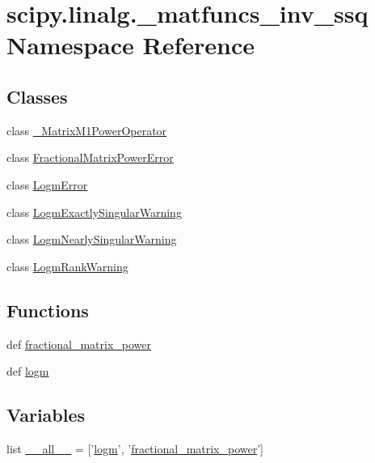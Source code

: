 \hypertarget{namespacescipy_1_1linalg_1_1__matfuncs__inv__ssq}{}\section{scipy.\+linalg.\+\_\+matfuncs\+\_\+inv\+\_\+ssq Namespace Reference}
\label{namespacescipy_1_1linalg_1_1__matfuncs__inv__ssq}
\subsection*{Classes}
\begin{DoxyCompactItemize}
\item 
class \hyperlink{classscipy_1_1linalg_1_1__matfuncs__inv__ssq_1_1__MatrixM1PowerOperator}{\+\_\+\+Matrix\+M1\+Power\+Operator}
\item 
class \hyperlink{classscipy_1_1linalg_1_1__matfuncs__inv__ssq_1_1FractionalMatrixPowerError}{Fractional\+Matrix\+Power\+Error}
\item 
class \hyperlink{classscipy_1_1linalg_1_1__matfuncs__inv__ssq_1_1LogmError}{Logm\+Error}
\item 
class \hyperlink{classscipy_1_1linalg_1_1__matfuncs__inv__ssq_1_1LogmExactlySingularWarning}{Logm\+Exactly\+Singular\+Warning}
\item 
class \hyperlink{classscipy_1_1linalg_1_1__matfuncs__inv__ssq_1_1LogmNearlySingularWarning}{Logm\+Nearly\+Singular\+Warning}
\item 
class \hyperlink{classscipy_1_1linalg_1_1__matfuncs__inv__ssq_1_1LogmRankWarning}{Logm\+Rank\+Warning}
\end{DoxyCompactItemize}
\subsection*{Functions}
\begin{DoxyCompactItemize}
\item 
def \hyperlink{namespacescipy_1_1linalg_1_1__matfuncs__inv__ssq_a671dec8058b079cfc6021ba7664ca754}{fractional\+\_\+matrix\+\_\+power}
\item 
def \hyperlink{namespacescipy_1_1linalg_1_1__matfuncs__inv__ssq_ab002cb04a0e0f317586ade471170e816}{logm}
\end{DoxyCompactItemize}
\subsection*{Variables}
\begin{DoxyCompactItemize}
\item 
list \hyperlink{namespacescipy_1_1linalg_1_1__matfuncs__inv__ssq_a9e5e39389f1854cb1f3f9a615dd54d48}{\+\_\+\+\_\+all\+\_\+\+\_\+} = \mbox{[}'\hyperlink{namespacescipy_1_1linalg_1_1__matfuncs__inv__ssq_ab002cb04a0e0f317586ade471170e816}{logm}', '\hyperlink{namespacescipy_1_1linalg_1_1__matfuncs__inv__ssq_a671dec8058b079cfc6021ba7664ca754}{fractional\+\_\+matrix\+\_\+power}'\mbox{]}
\end{DoxyCompactItemize}


